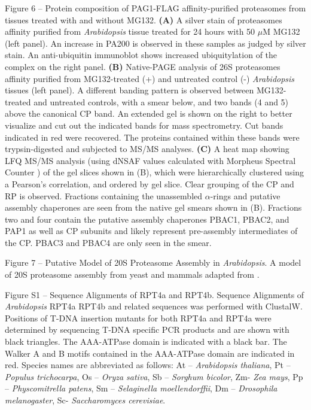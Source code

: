 Figure 6 – Protein composition of PAG1-FLAG affinity-purified proteasomes from tissues treated with and without MG132. \textbf{(A)} A silver stain of proteasomes affinity purified from \textit{Arabidopsis} tissue treated for 24 hours with 50 $\mu$M MG132 (left panel). An increase in PA200 is observed in these samples as judged by silver stain. An anti-ubiquitin immunoblot shows increased ubiquitylation of the complex on the right panel. \textbf{(B)} Native-PAGE analysis of 26S proteasomes affinity purified from MG132-treated (+) and untreated control (-) \textit{Arabidopsis} tissues (left panel). A different banding pattern is observed between MG132-treated and untreated controls, with a smear below, and two bands (4 and 5) above the canonical CP band. An extended gel is shown on the right to better visualize and cut out the indicated bands for mass spectrometry. Cut bands indicated in red were recovered. The proteins contained within these bands were trypsin-digested and subjected to MS/MS analyses. \textbf{(C)} A heat map showing LFQ MS/MS analysis (using dNSAF values calculated with Morpheus Spectral Counter \citep{gemperline16}) of the gel slices shown in (B), which were hierarchically clustered using a Pearson’s correlation, and ordered by gel slice. Clear grouping of the CP and RP is observed. Fractions containing the unassembled $\alpha$-rings and putative assembly chaperones are seen from the native gel smears shown in (B). Fractions two and four contain the putative assembly chaperones PBAC1, PBAC2, and PAP1 as well as CP subunits and likely represent pre-assembly intermediates of the CP. PBAC3 and PBAC4 are only seen in the smear.

Figure 7 – Putative Model of 20S Proteasome Assembly in \textit{Arabidopsis}. A model of 20S proteasome assembly from yeast and mammals adapted from \citep{murata09}.

Figure S1 – Sequence Alignments of RPT4a and RPT4b. Sequence Alignments of \textit{Arabidopsis} RPT4a RPT4b and related sequences was performed with ClustalW. Positions of T-DNA insertion mutants for both RPT4a and RPT4a were determined by sequencing T-DNA specific PCR products and are shown with black triangles. The AAA-ATPase domain is indicated with a black bar. The Walker A and B motifs contained in the AAA-ATPase domain are indicated in red. Species names are abbreviated as follows: At – \textit{Arabidopsis thaliana}, Pt – \textit{Populus trichocarpa}, Os – \textit{Oryza sativa}, Sb – \textit{Sorghum bicolor}, Zm- \textit{Zea mays}, Pp – \textit{Physcomitrella patens}, Sm – \textit{Selaginella moellendorffii}, Dm – \textit{Drosophila melanogaster}, Sc- \textit{Saccharomyces cerevisiae}.

